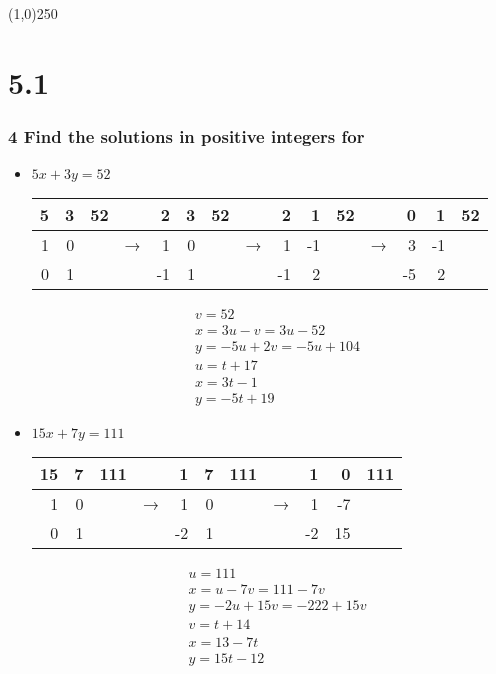 \documentclass[11pt]{article}
\begin{document}
\begin{center}
\line(1,0){250}
\end{center}

\section*{5.1}
\label{sec:org00cdb1d}
\subsubsection*{4 Find the solutions in positive integers for}
\label{sec:org8493662}
\begin{itemize}
\item \(5x + 3y = 52\)
\label{sec:org3b8ffe6}

\begin{center}
\begin{tabular}{rrrlrrrlrrrlrrr}
5 & 3 & 52 &  & 2 & 3 & 52 &  & 2 & 1 & 52 &  & 0 & 1 & 52\\
\hline
1 & 0 &  & → & 1 & 0 &  & → & 1 & -1 &  & → & 3 & -1 & \\
0 & 1 &  &  & -1 & 1 &  &  & -1 & 2 &  &  & -5 & 2 & \\
\end{tabular}
\end{center}

\setcounter{equation}{0}
\begin{eqnarray}
  &v = 52 \\ 
  &x = 3u - v = 3u - 52 \\
  &y = -5u + 2v = -5u + 104 \\
  &u = t + 17 \\ 
  &x = 3t - 1 \\
  &y = -5t + 19
\end{eqnarray}

\item \(15x + 7y = 111\)
\label{sec:orgc1605ac}

\begin{center}
\begin{tabular}{rrrlrrrlrrr}
15 & 7 & 111 &  & 1 & 7 & 111 &  & 1 & 0 & 111\\
\hline
1 & 0 &  & → & 1 & 0 &  & → & 1 & -7 & \\
0 & 1 &  &  & -2 & 1 &  &  & -2 & 15 & \\
\end{tabular}
\end{center}

\setcounter{equation}{0}
\begin{eqnarray}
  &u = 111 \\ 
  &x = u - 7v = 111 - 7v \\
  &y = -2u + 15v = -222 + 15v \\
  &v = t + 14 \\ 
  &x = 13 - 7t \\
  &y = 15t - 12
\end{eqnarray}


\end{itemize}
\end{document}
